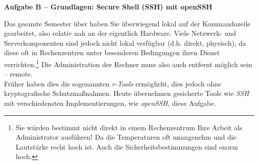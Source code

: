 \documentclass[paper=a4,fontsize=11pt]{scrartcl}%
\numberwithin{equation}{section}
\begin{document}
\begin{center}\Large{\textbf{Aufgabe B -- Grundlagen: Secure Shell (SSH) mit openSSH}}\end{center}\vskip0.25in
Das gesamte Semester über haben Sie überwiegend lokal auf der Kommandozeile gearbeitet, also relativ nah an der eigentlich Hardware. Viele Netzwerk- und Serverkomponenten sind jedoch nicht lokal verfügbar (d.h. direkt, physisch), da diese oft in Rechenzentren unter besonderen Bedingungen ihren Dienst verrichten.\footnote{Sie würden bestimmt nicht direkt in einem Rechenzentrum Ihre Arbeit als Administrator ausführen! Da die Temperaturen oft unangenehm und die Lautstärke recht hoch ist. Auch die Sicherheitsbestimmungen sind enorm hoch.} Die Administration der Rechner muss also auch entfernt möglich sein -- remote.\\
Früher haben dies die sogenannten \emph{r-Tools} ermöglicht, dies jedoch ohne kryptografische Schutzmaßnahmen. Heute übernehmen gesicherte Tools wie \emph{SSH} mit verschiedensten Implementierungen, wie \emph{openSSH}, diese Aufgabe.
\end{document}
